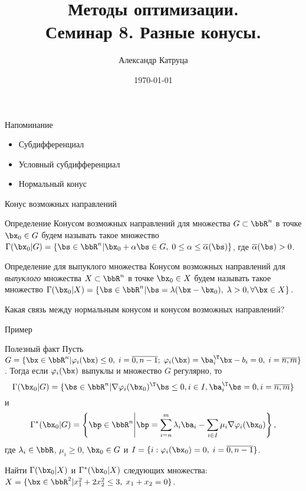 \documentclass[12pt]{beamer}
\title[Семинар 8]{Методы оптимизации. \\
 Семинар 8. Разные конусы.}
\author{Александр Катруца}
\institute{Московский физико-технический институт,\\
Факультет Управления и Прикладной Математики}
\date{\today}
\begin{document}
\begin{frame}
\maketitle
\end{frame}

\begin{frame}{Напоминание}
\begin{itemize}
\item Субдифференциал
\item Условный субдифференциал
\item Нормальный конус
\end{itemize}
\end{frame}

\begin{frame}{Конус возможных направлений}

\begin{block}{Определение}
Конусом возможных направлений для множества $G \subset \bbR^n$ в точке $\bx_0 \in G$ будем называть такое множество $\Gamma(\bx_0 | G) = \{ \bs \in \bbR^n | \bx_0 + \alpha\bs \in G, \; 0 \leq \alpha \leq \overline{\alpha}(\bs) \}$, где $\overline{\alpha}(\bs) > 0$.
\end{block}

\begin{block}{Определение для выпуклого множества}
Конусом возможных направлений для \emph{выпуклого} множества $X \subset \bbR^n$ в точке $\bx_0 \in X$ будем называть такое множество $\Gamma(\bx_0 | X) = \{ \bs \in \bbR^n | \bs = \lambda (\bx - \bx_0), \; \lambda > 0, \forall \bx \in X \}$.
\end{block}
Какая связь между нормальным конусом и конусом возможных направлений?

\end{frame}

\begin{frame}{Пример}
\begin{block}{Полезный факт}
Пусть $G = \{ \bx \in \bbR^n | \varphi_i(\bx) \leq 0, \; i = \overline{0,n-1}; \; \varphi_i(\bx) = \ba_i^{\T}\bx - b_i = 0, \; i = \overline{n, m} \}$. Тогда если $\varphi_i(\bx)$ выпуклы и множество $G$ регулярно, то \vspace{-4mm}
\[
\Gamma(\bx_0|G) = \{ \bs \in \bbR^n | \nabla \varphi_i(\bx_0)^{\T} \bs \leq 0, i \in I, \ba^{\T}_i \bs = 0, i = \overline{n,m} \}
\vspace{-4mm}
\]
и \vspace{-4mm}
\[
\Gamma^*(\bx_0|G) = \left \{ \bp \in \bbR^n \middle| \bp = \sum\limits_{i = n}^m \lambda_i\ba_i - \sum\limits_{i \in I} \mu_i \nabla\varphi_i(\bx_0) \right \},
\vspace{-4mm}
\]
где $\lambda_i \in \bbR$, $\mu_i \geq 0$, $\bx_0 \in G$ и $I = \{i: \varphi_i(\bx_0) = 0, \; i = \overline{0,n-1}\}$.
\end{block}
Найти $\Gamma(\bx_0|X)$ и $\Gamma^*(\bx_0|X)$ следующих множества:
$X = \{ \bx \in \bbR^2 | x^2_1 + 2x^2_2 \leq 3, \; x_1 + x_2 = 0 \}$.
\end{frame}
\end{document}
